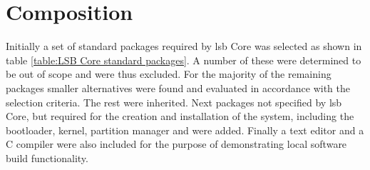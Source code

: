 \section{Composition}\label{Composition}

Initially a set of standard packages required by \gls{lsb} Core was selected as shown in table \ref{table:LSB Core standard packages}. A number of these were determined to be out of scope and were thus excluded. For the majority of the remaining packages smaller alternatives were found and evaluated in accordance with the selection criteria. The rest were inherited. Next packages not specified by \gls{lsb} Core, but required for the creation and installation of the system, including the bootloader, kernel, partition manager and  were added. Finally a text editor and a C compiler were also included for the purpose of demonstrating local software build functionality.

\newpage

\newpage

\newpage

